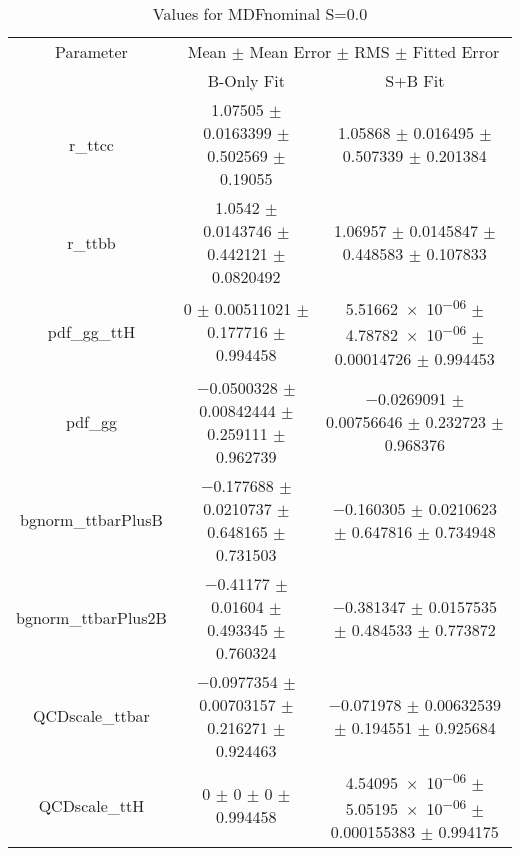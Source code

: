 \begin{table}
\centering
\caption{Values for MDFnominal S=0.0}
\begin{tabular}{ccc}
\toprule
Parameter & \multicolumn{2}{c}{Mean $\pm$ Mean Error $\pm$ RMS $\pm$ Fitted Error}\\
 & B-Only Fit & S+B Fit\\
\midrule
r\_ttcc & \num{1.07505} $\pm$ \num{0.0163399} $\pm$ \num{0.502569} $\pm$ \num{0.19055} & \num{1.05868} $\pm$ \num{0.016495} $\pm$ \num{0.507339} $\pm$ \num{0.201384}\\
r\_ttbb & \num{1.0542} $\pm$ \num{0.0143746} $\pm$ \num{0.442121} $\pm$ \num{0.0820492} & \num{1.06957} $\pm$ \num{0.0145847} $\pm$ \num{0.448583} $\pm$ \num{0.107833}\\
pdf\_gg\_ttH & \num{0} $\pm$ \num{0.00511021} $\pm$ \num{0.177716} $\pm$ \num{0.994458} & \num{5.51662e-06} $\pm$ \num{4.78782e-06} $\pm$ \num{0.00014726} $\pm$ \num{0.994453}\\
pdf\_gg & \num{-0.0500328} $\pm$ \num{0.00842444} $\pm$ \num{0.259111} $\pm$ \num{0.962739} & \num{-0.0269091} $\pm$ \num{0.00756646} $\pm$ \num{0.232723} $\pm$ \num{0.968376}\\
bgnorm\_ttbarPlusB & \num{-0.177688} $\pm$ \num{0.0210737} $\pm$ \num{0.648165} $\pm$ \num{0.731503} & \num{-0.160305} $\pm$ \num{0.0210623} $\pm$ \num{0.647816} $\pm$ \num{0.734948}\\
bgnorm\_ttbarPlus2B & \num{-0.41177} $\pm$ \num{0.01604} $\pm$ \num{0.493345} $\pm$ \num{0.760324} & \num{-0.381347} $\pm$ \num{0.0157535} $\pm$ \num{0.484533} $\pm$ \num{0.773872}\\
QCDscale\_ttbar & \num{-0.0977354} $\pm$ \num{0.00703157} $\pm$ \num{0.216271} $\pm$ \num{0.924463} & \num{-0.071978} $\pm$ \num{0.00632539} $\pm$ \num{0.194551} $\pm$ \num{0.925684}\\
QCDscale\_ttH & \num{0} $\pm$ \num{0} $\pm$ \num{0} $\pm$ \num{0.994458} & \num{4.54095e-06} $\pm$ \num{5.05195e-06} $\pm$ \num{0.000155383} $\pm$ \num{0.994175}\\
\bottomrule
\end{tabular}
\end{table}